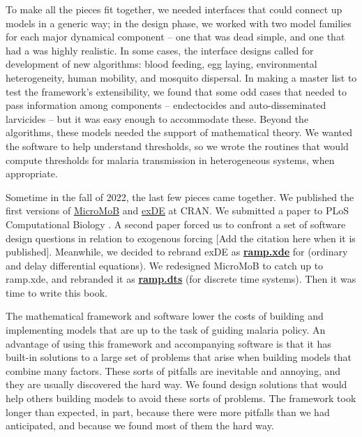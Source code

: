 \documentclass[
]{book}
\begin{document}
To make all the pieces fit together, we needed interfaces that could connect up models in a generic way; in the design phase, we worked with two model families for each major dynamical component -- one that was dead simple, and one that had a was highly realistic.
In some cases, the interface designs called for development of new algorithms: blood feeding, egg laying, environmental heterogeneity, human mobility, and mosquito dispersal.
In making a master list to test the framework's extensibility, we found that some odd cases that needed to pass information among components -- endectocides and auto-disseminated larvicides -- but it was easy enough to accommodate these.
Beyond the algorithms, these models needed the support of mathematical theory.
We wanted the software to help understand thresholds, so we wrote the routines that would compute thresholds for malaria transmission in heterogeneous systems, when appropriate.

Sometime in the fall of 2022, the last few pieces came together. We published the first versions of \href{https://cran.r-project.org/package=MicroMoB}{MicroMoB} and \href{https://CRAN.R-project.org/package=exDE}{exDE} at CRAN.
We submitted a paper to PLoS Computational Biology \autocite{WuSL2023SpatialDynamics}. A second paper forced us to confront a set of software design questions in relation to exogenous forcing {[}Add the citation here when it is published{]}. Meanwhile, we decided to rebrand exDE as \href{https://dd-harp.github.io/ramp.xde/}{\textbf{ramp.xde}} for (ordinary and delay differential equations). We redesigned MicroMoB to catch up to ramp.xde, and rebranded it as \href{https://dd-harp.github.io/ramp.dts/}{\textbf{ramp.dts}} (for discrete time systems).
Then it was time to write this book.

The mathematical framework and software lower the costs of building and implementing models that are up to the task of guiding malaria policy.
An advantage of using this framework and accompanying software is that it has built-in solutions to a large set of problems that arise when building models that combine many factors.
These sorts of pitfalls are inevitable and annoying, and they are usually discovered the hard way.
We found design solutions that would help others building models to avoid these sorts of problems.
The framework took longer than expected, in part, because there were more pitfalls than we had anticipated, and because we found most of them the hard way.
\end{document}
